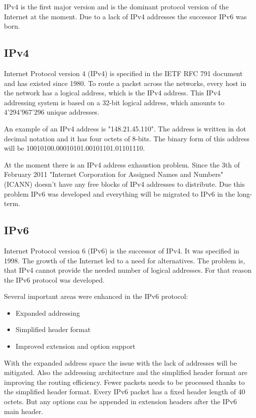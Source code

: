 \documentclass[a4paper]{report}
\begin{document}
IPv4 is the first major version and is the dominant protocol version of the Internet at the moment. Due to a lack of IPv4 addresses the successor IPv6 was born. \parencite{NadeemUnuth2016}

\subsection{IPv4}
\label{ssec:IPv4}
Internet Protocol version 4 (IPv4) is specified in the IETF RFC 791 document \parencite{Postel} and has existed since 1980. To route a packet across the networks, every host in the network has a logical address, which is the IPv4 address. This IPv4 addressing system is based on a 32-bit logical address, which amounts to 4'294'967'296 unique addresses.

An example of an IPv4 address is "148.21.45.110". The address is written in dot decimal notation and it has four octets of 8-bits. The binary form of this address will be 10010100.00010101.00101101.01101110. \parencite{Babatunde2014}

At the moment there is an IPv4 address exhaustion problem. Since the 3th of February 2011 "Internet Corporation for Assigned Names and Numbers" (ICANN) doesn't have any free blocks of IPv4 addresses to distribute. Due this problem IPv6 was developed and everything will be migrated to IPv6 in the long-term. 
\subsection{IPv6}
\label{ssec:IPv6}
Internet Protocol version 6 (IPv6) is the successor of IPv4. It was specified in 1998. The growth of the Internet led to a need for alternatives. The problem is, that IPv4 cannot provide the needed number of logical addresses. For that reason the IPv6 protocol was developed.\parencite[11]{Babatunde2014}

Several important areas were enhanced in the IPv6 protocol:
\begin{itemize}
	\item Expanded addressing
	\item Simplified header format
	\item Improved extension and option support
\end{itemize}
With the expanded address space the issue with the lack of addresses will be mitigated. Also the addressing architecture and the simplified header format are improving the routing efficiency. Fewer packets needs to be processed thanks to the simplified header format. 
Every IPv6 packet has a fixed header length of 40 octets. But any options can be appended in extension headers after the IPv6 main header. \parencite[106-107,123-124]{Loshin2004}
\end{document}
